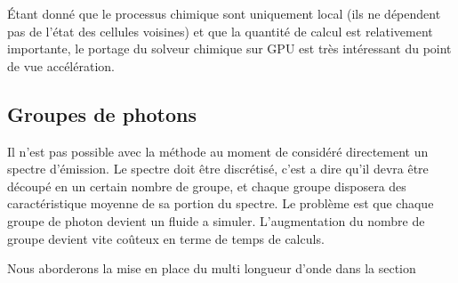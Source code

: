 Étant donné que le processus chimique sont uniquement local (ils ne dépendent pas de l'état des cellules voisines) et que la quantité de calcul est relativement importante, le portage du solveur chimique sur GPU est très intéressant du point de vue accélération.


\subsection{Groupes de photons}
\label{sec:groupedephotons}

Il n'est pas possible avec la méthode au moment de considéré directement un spectre d'émission.
Le spectre doit être discrétisé, c'est a dire qu'il devra être découpé en un certain nombre de groupe, et chaque groupe disposera des caractéristique moyenne de sa portion du spectre.
Le problème est que chaque groupe de photon devient un fluide a simuler. 
L'augmentation du nombre de groupe devient vite coûteux en terme de temps de calculs.


Nous aborderons la mise en place du multi longueur d'onde dans la section %


